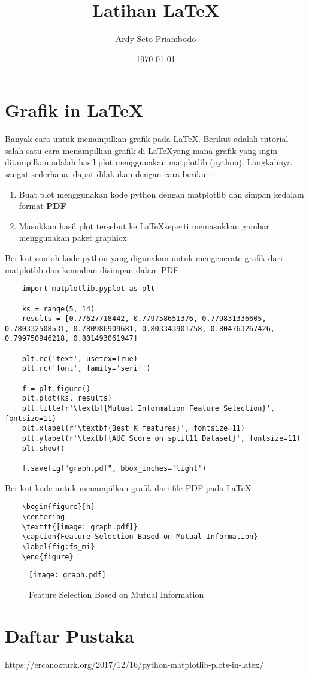 \documentclass{article}
\title{Latihan \LaTeX}
\author{Ardy Seto Priambodo}
\date{\today}
\begin{document}
\maketitle

\section*{Grafik in \LaTeX}

Banyak cara untuk menampilkan grafik pada \LaTeX. Berikut adalah tutorial salah satu cara menampilkan grafik di \LaTeX yang mana grafik yang ingin ditampilkan adalah hasil plot menggunakan matplotlib (python). Langkahnya sangat sederhana, dapat dilakukan dengan cara berikut :

\begin{enumerate}
    \item Buat plot menggunakan kode python dengan matplotlib dan simpan kedalam format \textbf{PDF}
    \item Masukkan hasil plot tersebut ke \LaTeX seperti memasukkan gambar menggunakan paket graphicx
\end{enumerate}

\noindent Berikut contoh kode python yang digunakan untuk mengenerate grafik dari matplotlib dan kemudian disimpan dalam PDF

\begin{verbatim}
    import matplotlib.pyplot as plt

    ks = range(5, 14)
    results = [0.77627718442, 0.779758651376, 0.779831336605, 0.780332508531, 0.780986909681, 0.803343901758, 0.804763267426, 0.799750946218, 0.801493061947]
    
    plt.rc('text', usetex=True)
    plt.rc('font', family='serif')
    
    f = plt.figure()
    plt.plot(ks, results)
    plt.title(r'\textbf{Mutual Information Feature Selection}', fontsize=11)
    plt.xlabel(r'\textbf{Best K features}', fontsize=11)
    plt.ylabel(r'\textbf{AUC Score on split11 Dataset}', fontsize=11)
    plt.show()

    f.savefig("graph.pdf", bbox_inches='tight')
\end{verbatim}

\noindent Berikut kode untuk menampilkan grafik dari file PDF pada \LaTeX

\begin{verbatim}
    \begin{figure}[h]
    \centering
    \texttt{[image: graph.pdf]}
    \caption{Feature Selection Based on Mutual Information}
    \label{fig:fs_mi}
    \end{figure}
\end{verbatim}

\begin{figure}[h]
\centering
\texttt{[image: graph.pdf]}
\caption{Feature Selection Based on Mutual Information}
\label{fig:fs_mi}
\end{figure}

\section*{Daftar Pustaka}
https://ercanozturk.org/2017/12/16/python-matplotlib-plots-in-latex/
\end{document}
